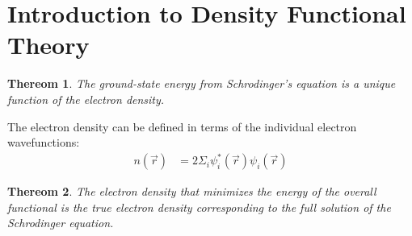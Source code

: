 \documentclass{article}
\newtheorem{mydef}{Thereom}
\numberwithin{equation}{section}
\begin{document}
\section*{Introduction to Density Functional Theory}

\begin{mydef}The ground-state energy from Schrodinger's equation is a unique function of the electron density.
\end{mydef}
The electron density can be defined in terms of the individual electron wavefunctions:
\begin{align*}
	n(\vec{r})&=2\Sigma_i\psi_i^*(\vec{r})\psi_i(\vec{r})
\end{align*}

\begin{mydef}The electron density that minimizes the energy of the overall functional is the true electron density corresponding to the full solution of the Schrodinger equation.
\end{mydef}
\end{document}
